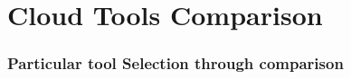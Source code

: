 \setcounter{section}{0}
\part{Cloud Tools Comparison}\label{sec:toolComparison}

\section{Particular tool Selection through comparison}


\newpage